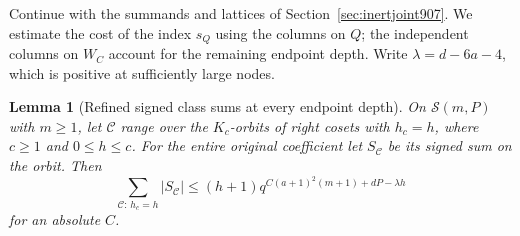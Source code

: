 \documentclass[a4paper,11pt]{article}
\newtheorem{lemma}[proposition]{Lemma}
\theoremstyle{definition}
\theoremstyle{remark}
\numberwithin{equation}{section}
\begin{document}
Continue with the summands and lattices of
Section~\ref{sec:inertjoint907}. We estimate the cost of the
index \(s_Q\) using the columns on \(Q\); the independent
columns on \(W_C\) account for the remaining endpoint depth.
Write \(\lambda=d-6a-4\), which is positive at sufficiently
large nodes.

\begin{lemma}[Refined signed class sums at every endpoint depth]
\leavevmode\label{lem:inertdepth908}
On \(\mathcal S(m,P)\) with \(m\ge1\), let \(\mathcal C\) range
over the \(K_c\)-orbits of right cosets with \(h_c=h\), where
\(c\ge1\) and \(0\le h\le c\). For the entire original coefficient
let \(S_{\mathcal C}\) be its signed sum on the orbit. Then
\begin{equation}
       \sum_{\mathcal C:\,h_c=h}|S_{\mathcal C}|
           \le (h+1)q^{C(a+1)^2(m+1)+dP-\lambda h}
 \label{eq:inertdepth908}
\end{equation}
for an absolute \(C\).
\end{lemma}
\end{document}
